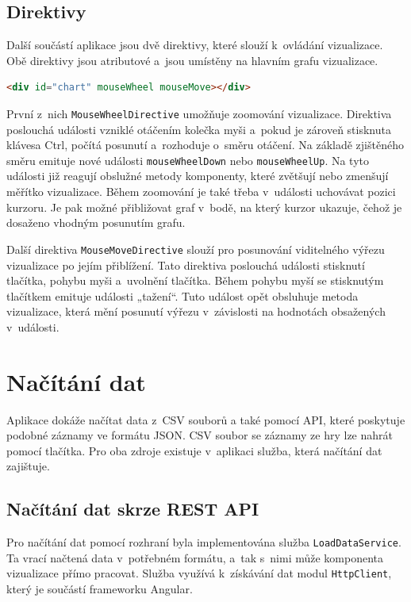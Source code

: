 \documentclass[
  digital, %
  oneside, %
  table,   %
  nolof,     %
  nolot,     %
]{fithesis3}
\begin{document}
\subsection{Direktivy} \label{directives}
Další součástí aplikace jsou dvě direktivy, které slouží k~ovládání vizualizace. Obě direktivy jsou atributové a~jsou umístěny na hlavním grafu vizualizace.\par
\begin{lstlisting}[showstringspaces=false,language=html]
<div id="chart" mouseWheel mouseMove></div>
\end{lstlisting}
První z~nich \verb|MouseWheelDirective| umožňuje zoomování vizualizace. Direktiva poslouchá události vzniklé otáčením kolečka myši a~pokud je zároveň stisknuta klávesa Ctrl, počítá posunutí a~rozhoduje o~směru otáčení. Na základě zjištěného směru emituje nové události \verb|mouseWheelDown| nebo \verb|mouseWheelUp|. Na tyto události již reagují obslužné metody komponenty, které zvětšují nebo zmenšují měřítko vizualizace. Během zoomování je také třeba v~události uchovávat pozici kurzoru. Je pak možné přibližovat graf v~bodě, na který kurzor ukazuje, čehož je dosaženo vhodným posunutím grafu.\par
Další direktiva \verb|MouseMoveDirective| slouží pro posunování viditelného výřezu vizualizace po jejím přiblížení. Tato direktiva poslouchá události stisknutí tlačítka, pohybu myši a~uvolnění tlačítka. Během pohybu myší se stisknutým tlačítkem emituje události „tažení“. Tuto událost opět obsluhuje metoda vizualizace, která mění posunutí výřezu v~závislosti na hodnotách obsažených v~události.

\section{Načítání dat}
Aplikace dokáže načítat data z~CSV souborů a také pomocí API, které poskytuje podobné záznamy ve formátu JSON. CSV soubor se záznamy ze hry lze nahrát pomocí tlačítka. Pro oba zdroje existuje v~aplikaci služba, která načítání dat zajištuje.
\subsection{Načítání dat skrze REST API}
Pro načítání dat pomocí rozhraní byla implementována služba \verb|Load|\-\verb|DataService|. Ta vrací načtená data v~potřebném formátu, a~tak s~nimi může komponenta vizualizace přímo pracovat. Služba využívá k~získávání dat modul \verb|HttpClient|, který je součástí frameworku Angular.
\end{document}
